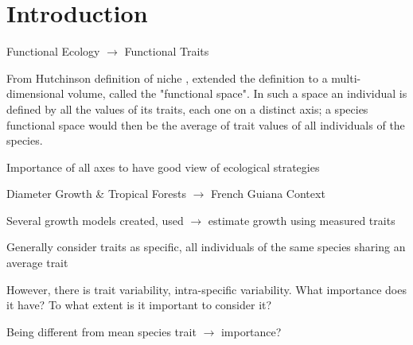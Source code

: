 \label{sec:Intro}
\section*{Introduction}

Functional Ecology $\rightarrow$ Functional Traits


From Hutchinson definition of niche \citep{hutchinson_concluding_1957}, \citet{violle_towards_2009} extended the definition to a multi-dimensional volume, called the "functional space". In such a space an individual is defined by all the values of its traits, each one on a distinct axis;  a species functional space would then be the average of trait values of all individuals of the species.



Importance of all axes to have good view of ecological strategies

Diameter Growth \& Tropical Forests $\rightarrow$ French Guiana Context

Several growth models created, used $\rightarrow$ estimate growth using measured traits

Generally consider traits as specific, all individuals of the same species sharing an average trait

However, there is trait variability, intra-specific variability. What importance does it have? To what extent is it important to consider it? 

Being different from mean species trait $\rightarrow$ importance?

